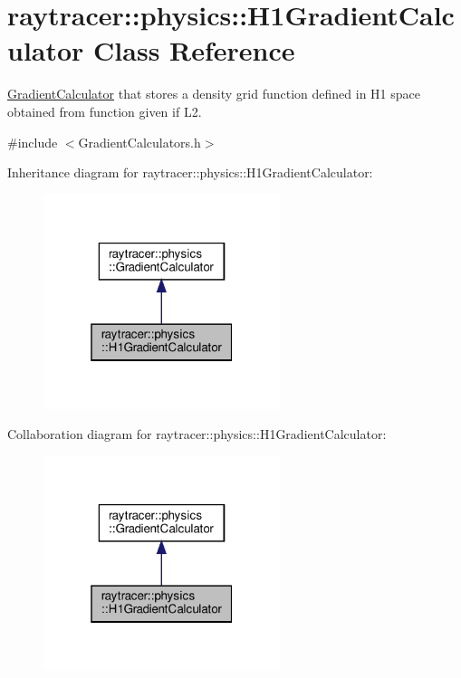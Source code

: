 \hypertarget{classraytracer_1_1physics_1_1H1GradientCalculator}{}\section{raytracer\+:\+:physics\+:\+:H1\+Gradient\+Calculator Class Reference}
\label{classraytracer_1_1physics_1_1H1GradientCalculator}


\hyperlink{classraytracer_1_1physics_1_1GradientCalculator}{Gradient\+Calculator} that stores a density grid function defined in H1 space obtained from function given if L2.  




{\ttfamily \#include $<$Gradient\+Calculators.\+h$>$}



Inheritance diagram for raytracer\+:\+:physics\+:\+:H1\+Gradient\+Calculator\+:\nopagebreak
\begin{figure}[H]
\begin{center}
\leavevmode
\includegraphics[width=196pt]{classraytracer_1_1physics_1_1H1GradientCalculator__inherit__graph}
\end{center}
\end{figure}


Collaboration diagram for raytracer\+:\+:physics\+:\+:H1\+Gradient\+Calculator\+:\nopagebreak
\begin{figure}[H]
\begin{center}
\leavevmode
\includegraphics[width=196pt]{classraytracer_1_1physics_1_1H1GradientCalculator__coll__graph}
\end{center}
\end{figure}
